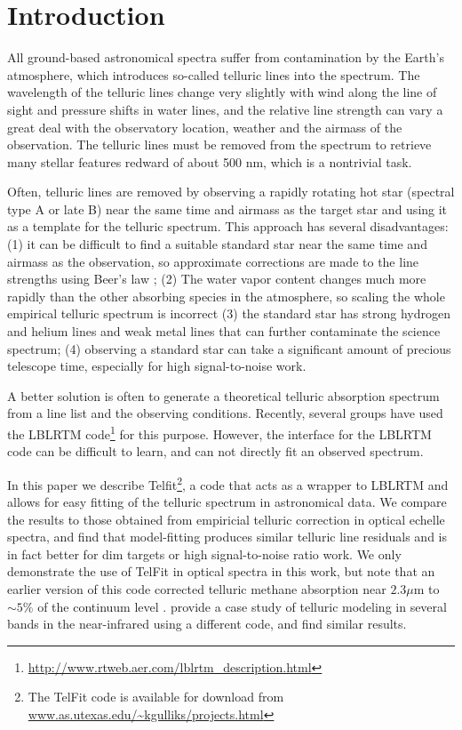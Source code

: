 

\section{Introduction}
All ground-based astronomical spectra suffer from contamination by the Earth's atmosphere, which introduces so-called telluric lines into the spectrum. The wavelength of the telluric lines change very slightly with wind along the line of sight and pressure shifts in water lines, and the relative line strength can vary a great deal with the observatory location, weather and the airmass of the observation. The telluric lines must be removed from the spectrum to retrieve many stellar features redward of about 500 nm, which is a nontrivial task.

Often, telluric lines are removed by observing a rapidly rotating hot star (spectral type A or late B) near the same time and airmass as the target star and using it as a template for the telluric spectrum. This approach has several disadvantages: (1) it can be difficult to find a suitable standard star near the same time and airmass as the observation, so approximate corrections are made to the line strengths using Beer's law \citep{Beer1852}; (2) The water vapor content changes much more rapidly than the other absorbing species in the atmosphere, so scaling the whole empirical telluric spectrum is incorrect (3) the standard star has strong hydrogen and helium lines and weak metal lines that can further contaminate the science spectrum; (4) observing a standard star can take a significant amount of precious telescope time, especially for high signal-to-noise work.

A better solution is often to generate a theoretical telluric absorption spectrum from a line list and the observing conditions. Recently, several groups \citep{Seifahrt2011, Bertaux2013, Husser2013, Cotton2013, Gullikson2013} have used the LBLRTM code\footnote{\url{http://www.rtweb.aer.com/lblrtm_description.html}} \citep[][Line By Line Radiative Transfer Model]{Clough2005} for this purpose. However, the interface for the LBLRTM code can be difficult to learn, and can not directly fit an observed spectrum. 

In this paper we describe Telfit\footnote{The TelFit code is available for download from \url{www.as.utexas.edu/~kgulliks/projects.html}}, a code that acts as a wrapper to LBLRTM and allows for easy fitting of the telluric spectrum in astronomical data. We compare the results to those obtained from empiricial telluric correction in optical echelle spectra, and find that model-fitting produces similar telluric line residuals and is in fact better for dim targets or high signal-to-noise ratio work. We only demonstrate the use of TelFit in optical spectra in this work, but note that an earlier version of this code corrected telluric methane absorption near $2.3 \mu$m to $\sim 5\%$ of the continuum level \citep{Gullikson2013}. \cite{Seifahrt2011} provide a case study of telluric modeling in several bands in the near-infrared using a different code, and find similar results.



